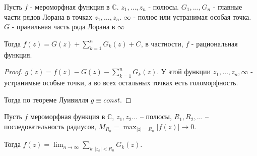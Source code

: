 \begin{theorem}

    Пусть $f$ - мероморфная функция в $\mathbb{C}$. $z_1, \ldots, z_n$ - полюсы.
    $G_1, \ldots, G_n$ - главные части рядов Лорана в точках $z_1, \ldots, z_n$.
    $\infty$ - полюс или устранимая особая точка. $G$ - правильная часть
    ряда Лорана в $\infty$

    Тогда $f(z) = G(z) + \sum_{k = 1}^n G_k(z) + C$, в частности, 
    $f$ - рациональная функция.
\end{theorem}

\begin{proof}
    $g(z) = f(z) - G(z) - \sum_{k = 1}^n G_k(z)$. У этой функции $z_1, \ldots, z_n, \infty$ - 
    устранимые особые точки, а во всех остальных точках есть голоморфность. 

    Тогда по теореме Луивилля $g \equiv const$.
\end{proof}

\begin{theorem}
    Пусть $f$ мероморфная функция в $\mathbb{C}$, $z_1, z_2 \ldots$ -- полюсы,
    $R_1, R_2, \ldots$ -- последовательность радиусов, $M_{R_n} = \max_{|z| = R_n} |f(z)| \rightarrow 0$.

    Тогда $f(z) = \lim_{n \to \infty} \sum_{k:|z_k| < R_n} G_k (z)$.
\end{theorem}

